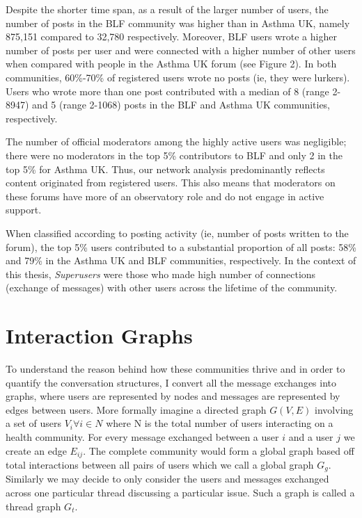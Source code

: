 Despite the shorter time span, as a result of the larger number of users, the number of posts in the BLF community was higher than in Asthma UK, namely 875,151 compared to 32,780 respectively. Moreover, BLF users wrote a higher number of posts per user and were connected with a higher number of other users when compared with people in the Asthma UK forum (see Figure 2). In both communities, 60\%-70\% of registered users wrote no posts (ie, they were lurkers). Users who wrote more than one post contributed with a median of 8 (range 2-8947) and 5 (range 2-1068) posts in the BLF and Asthma UK communities, respectively.

The number of official moderators among the highly active users was negligible; there were no moderators in the top 5\% contributors to BLF and only 2 in the top 5\% for Asthma UK. Thus, our network analysis predominantly reflects content originated from registered users. This also means that moderators on these forums have more of an observatory role and do not engage in active support. 

When classified according to posting activity (ie, number of posts written to the forum), the top 5\% users contributed to a substantial proportion of all posts: 58\% and 79\% in the Asthma UK and BLF communities, respectively. In the context of this thesis, \textsl{Superusers} were those who made high number of connections (exchange of messages) with other users across the lifetime of the community.


\section{Interaction Graphs}
\label{sec:graphs}
To understand the reason behind how these communities thrive and in order to quantify the conversation structures, I convert all the message exchanges into graphs, where users are represented by nodes and messages are represented by edges between users. 
More formally imagine a directed graph $G(V,E)$ involving a set of users $V_i\forall i \in N$ where N is the total number of users interacting on a health community. For every message exchanged between a user $i$ and a user $j$ we create an edge $E_{ij}$. The complete community would form a global graph based off total interactions between all pairs of users which we call a global graph $G_g$. Similarly we may decide to only consider the users and messages exchanged across one particular thread discussing a particular issue. Such a graph is called a thread graph $G_t$.

